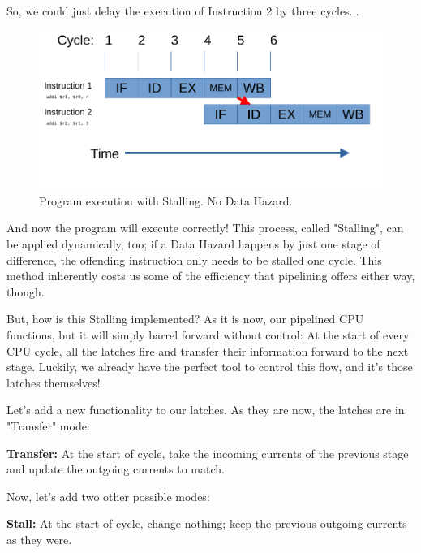 \documentclass[12pt,twoside]{reedthesis}
\begin{document}
So, we could just delay the execution of Instruction 2 by three cycles...

\begin{figure}[h!]

	\centering
	\includegraphics[scale=0.9]{stall}
	\caption{Program execution with Stalling. No Data Hazard.}
	\label{stall}
\end{figure}

And now the program will execute correctly! This process, called "Stalling", can be applied dynamically, too; if a Data Hazard happens by just one stage of difference, the offending instruction only needs to be stalled one cycle. This method inherently costs us some of the efficiency that pipelining offers either way, though.

But, how is this Stalling implemented? As it is now, our pipelined CPU functions, but it will simply barrel forward without control: At the start of every CPU cycle, all the latches fire and transfer their information forward to the next stage. Luckily, we already have the perfect tool to control this flow, and it's those latches themselves!

Let's add a new functionality to our latches. As they are now, the latches are in "Transfer" mode:

\qquad \textbf{Transfer:} At the start of cycle, take the incoming currents of the previous stage and update the outgoing currents to match.

Now, let's add two other possible modes:

\qquad \textbf{Stall:} At the start of cycle, change nothing; keep the previous outgoing currents as they were.
\end{document}
